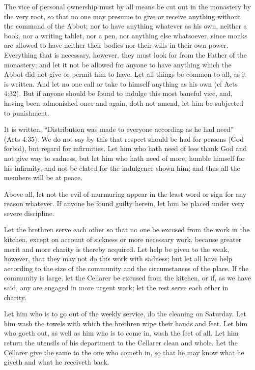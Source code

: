 
The vice of personal ownership must by all means be cut out in the monastery by the very root, so that no one may presume to give or receive anything without the command of the Abbot; nor to have anything whatever as his own, neither a book, nor a writing tablet, nor a pen, nor anything else whatsoever, since monks are allowed to have neither their bodies nor their wills in their own power. Everything that is necessary, however, they must look for from the Father of the monastery; and let it not be allowed for anyone to have anything which the Abbot did not give or permit him to have. Let all things be common to all, as it is written. And let no one call or take to himself anything as his own (cf Acts 4:32). But if anyone should be found to indulge this most baneful vice, and, having been admonished once and again, doth not amend, let him be subjected to punishment.


It is written, ``Distribution was made to everyone according as he had need'' (Acts 4:35). We do not say by this that respect should be had for persons (God forbid), but regard for infirmities. Let him who hath need of less thank God and not give way to sadness, but let him who hath need of more, humble himself for his infirmity, and not be elated for the indulgence shown him; and thus all the members will be at peace.

Above all, let not the evil of murmuring appear in the least word or sign for any reason whatever. If anyone be found guilty herein, let him be placed under very severe discipline.


Let the brethren serve each other so that no one be excused from the work in the kitchen, except on account of sickness or more necessary work, because greater merit and more charity is thereby acquired. Let help be given to the weak, however, that they may not do this work with sadness; but let all have help according to the size of the community and the circumstances of the place. If the community is large, let the Cellarer be excused from the kitchen, or if, as we have said, any are engaged in more urgent work; let the rest serve each other in charity.

Let him who is to go out of the weekly service, do the cleaning on Saturday. Let him wash the towels with which the brethren wipe their hands and feet. Let him who goeth out, as well as him who is to come in, wash the feet of all. Let him return the utensils of his department to the Cellarer clean and whole. Let the Cellarer give the same to the one who cometh in, so that he may know what he giveth and what he receiveth back.

